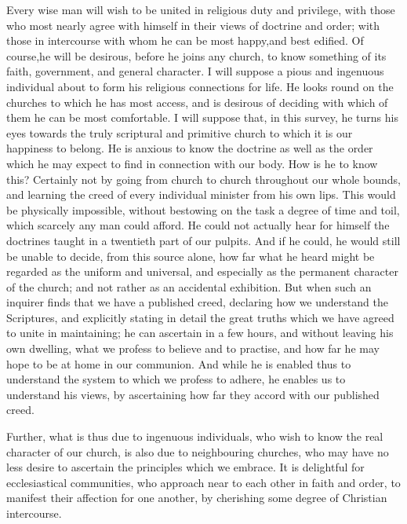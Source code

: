 \documentclass[
]{book}
\begin{document}
Every wise man will wish to be united in religious duty and privilege, with those who most nearly agree with himself in their views of doctrine and order; with those in intercourse with whom he can be most happy,and best edified. Of course,he will be desirous, before he joins any church, to know something of its faith, government, and general character. I will suppose a pious and ingenuous individual about to form his religious connections for life. He looks round on the churches to which he has most access, and is desirous of deciding with which of them he can be most comfortable. I will suppose that, in this survey, he turns his eyes towards the truly scriptural and primitive church to which it is our happiness to belong. He is anxious to know the doctrine as well as the order which he may expect to find in connection with our body. How is he to know this? Certainly not by going from church to church throughout our whole bounds, and learning the creed of every individual minister from his own lips. This would be physically impossible, without bestowing on the task a degree of time and toil, which scarcely any man could afford. He could not actually hear for himself the doctrines taught in a twentieth part of our pulpits. And if he could, he would still be unable to decide, from this source alone, how far what he heard might be regarded as the uniform and universal, and especially as the permanent character of the church; and not rather as an accidental exhibition. But when such an inquirer finds that we have a published creed, declaring how we understand the Scriptures, and explicitly stating in detail the great truths which we have agreed to unite in maintaining; he can ascertain in a few hours, and without leaving his own dwelling, what we profess to believe and to practise, and how far he may hope to be at home in our communion. And while he is enabled thus to understand the system to which we profess to adhere, he enables us to understand his views, by ascertaining how far they accord with our published creed.

Further, what is thus due to ingenuous individuals, who wish to know the real character of our church, is also due to neighbouring churches, who may have no less desire to ascertain the principles which we embrace. It is delightful for ecclesiastical communities, who approach near to each other in faith and order, to manifest their affection for one another, by cherishing some degree of Christian intercourse.
\end{document}
